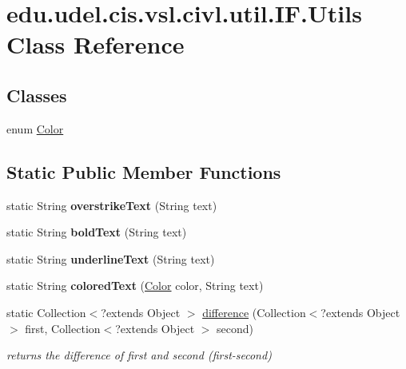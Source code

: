 \hypertarget{classedu_1_1udel_1_1cis_1_1vsl_1_1civl_1_1util_1_1IF_1_1Utils}{}\section{edu.\+udel.\+cis.\+vsl.\+civl.\+util.\+I\+F.\+Utils Class Reference}
\label{classedu_1_1udel_1_1cis_1_1vsl_1_1civl_1_1util_1_1IF_1_1Utils}
\subsection*{Classes}
\begin{DoxyCompactItemize}
\item 
enum \hyperlink{enumedu_1_1udel_1_1cis_1_1vsl_1_1civl_1_1util_1_1IF_1_1Utils_1_1Color}{Color}
\end{DoxyCompactItemize}
\subsection*{Static Public Member Functions}
\begin{DoxyCompactItemize}
\item 
\hypertarget{classedu_1_1udel_1_1cis_1_1vsl_1_1civl_1_1util_1_1IF_1_1Utils_aa2a468e95cb0a0cb79691a0ed336b6d6}{}static String {\bfseries overstrike\+Text} (String text)\label{classedu_1_1udel_1_1cis_1_1vsl_1_1civl_1_1util_1_1IF_1_1Utils_aa2a468e95cb0a0cb79691a0ed336b6d6}

\item 
\hypertarget{classedu_1_1udel_1_1cis_1_1vsl_1_1civl_1_1util_1_1IF_1_1Utils_a3fce3308a043f193854d1a26b74b643f}{}static String {\bfseries bold\+Text} (String text)\label{classedu_1_1udel_1_1cis_1_1vsl_1_1civl_1_1util_1_1IF_1_1Utils_a3fce3308a043f193854d1a26b74b643f}

\item 
\hypertarget{classedu_1_1udel_1_1cis_1_1vsl_1_1civl_1_1util_1_1IF_1_1Utils_aeaabf42b50e2ab4913b3b325f10d474c}{}static String {\bfseries underline\+Text} (String text)\label{classedu_1_1udel_1_1cis_1_1vsl_1_1civl_1_1util_1_1IF_1_1Utils_aeaabf42b50e2ab4913b3b325f10d474c}

\item 
\hypertarget{classedu_1_1udel_1_1cis_1_1vsl_1_1civl_1_1util_1_1IF_1_1Utils_adcec23be711d86d79e1223313f86099c}{}static String {\bfseries colored\+Text} (\hyperlink{enumedu_1_1udel_1_1cis_1_1vsl_1_1civl_1_1util_1_1IF_1_1Utils_1_1Color}{Color} color, String text)\label{classedu_1_1udel_1_1cis_1_1vsl_1_1civl_1_1util_1_1IF_1_1Utils_adcec23be711d86d79e1223313f86099c}

\item 
static Collection$<$?extends Object $>$ \hyperlink{classedu_1_1udel_1_1cis_1_1vsl_1_1civl_1_1util_1_1IF_1_1Utils_abe018acde5b0ee58b673576a4ccb9e38}{difference} (Collection$<$?extends Object $>$ first, Collection$<$?extends Object $>$ second)
\begin{DoxyCompactList}\small\item\em returns the difference of first and second (first-\/second) \end{DoxyCompactList}\end{DoxyCompactItemize}

